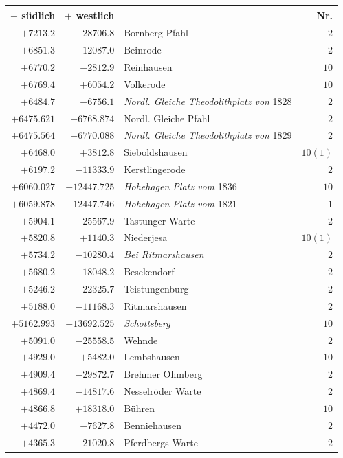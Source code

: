 \clearpage{}%
\begin{center}\begingroup\fontsize{8}{9}\selectfont
\setlength{\tabcolsep}{4pt}
\begin{tabular}{r|r|p{170pt}|r}\hline
\(+\) südlich&\(+\) westlich&&Nr.\\\hline
\(+7213.2\)&\(-28706.8\)&Bornberg Pfahl&\(2\)\\
\(+6851.3\)&\(-12087.0\)&Beinrode&\(2\)\\
\(+6770.2\)&\(-2812.9\)&Reinhausen&\(10\)\\
\(+6769.4\)&\(+6054.2\)&Volkerode&\(10\)\\
\(+6484.7\)&\(-6756.1\)&\textit{Nordl. Gleiche Theodolithplatz von} 1828&\(2\)\\
\(+6475.621\)&\(-6768.874\)&Nordl. Gleiche Pfahl&\(2\)\\
\(+6475.564\)&\(-6770.088\)&\textit{Nordl. Gleiche Theodolithplatz von} 1829&\(2\)\\
\(+6468.0\)&\(+3812.8\)&Sieboldshausen&\(10(1)\)\\
\(+6197.2\)&\(-11333.9\)&Kerstlingerode&\(2\)\\
\(+6060.027\)&\(+12447.725\)&\textit{Hohehagen Platz vom} 1836&\(10\)\\
\(+6059.878\)&\(+12447.746\)&\textit{Hohehagen Platz vom} 1821&\(1\)\\
\(+5904.1\)&\(-25567.9\)&Tastunger Warte&\(2\)\\
\(+5820.8\)&\(+1140.3\)&Niederjesa&\(10(1)\)\\
\(+5734.2\)&\(-10280.4\)&\textit{Bei Ritmarshausen}&\(2\)\\
\(+5680.2\)&\(-18048.2\)&Besekendorf&\(2\)\\
\(+5246.2\)&\(-22325.7\)&Teistungenburg&\(2\)\\
\(+5188.0\)&\(-11168.3\)&Ritmarshausen&\(2\)\\
\(+5162.993\)&\(+13692.525\)&\textit{Schottsberg}&\(10\)\\
\(+5091.0\)&\(-25558.5\)&Wehnde&\(2\)\\
\(+4929.0\)&\(+5482.0\)&Lembshausen&\(10\)\\
\(+4909.4\)&\(-29872.7\)&Brehmer Ohmberg&\(2\)\\
\(+4869.4\)&\(-14817.6\)&Nesselröder Warte&\(2\)\\
\(+4866.8\)&\(+18318.0\)&Bühren&\(10\)\\
\(+4472.0\)&\(-7627.8\)&Benniehausen&\(2\)\\
\(+4365.3\)&\(-21020.8\)&Pferdbergs Warte&\(2\)\\

\end{tabular}
\end{center}
